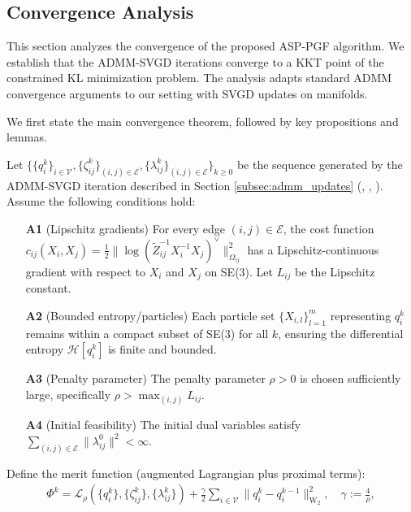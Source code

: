 \subsection{Convergence Analysis}
\label{sec:convergence}

This section analyzes the convergence of the proposed ASP-PGF algorithm. We establish that the ADMM-SVGD iterations converge to a KKT point of the constrained KL minimization problem. The analysis adapts standard ADMM convergence arguments to our setting with SVGD updates on manifolds.

We first state the main convergence theorem, followed by key propositions and lemmas.

\begin{theorem}
\label{thm:convergence}
Let $\{ \{q_i^k\}_{i \in {\mathcal{V}}}, \{\zeta_{ij}^k\}_{(i,j) \in {\mathcal{E}}}, \{\lambda_{ij}^k\}_{(i,j) \in {\mathcal{E}}} \}_{k \ge 0}$ be the sequence generated by the ADMM-SVGD iteration described in Section \ref{subsec:admm_updates} (, , ). Assume the following conditions hold:
\begin{itemize}
    \item[\textbf{A1}] (Lipschitz gradients) For every edge $(i,j) \in {\mathcal{E}}$, the cost function $c_{ij}(X_i, X_j) = \frac{1}{2} \| \log({\tilde{Z}}_{ij}^{-1} X_i^{-1} X_j)^{\vee} \|^2_{\Omega_{ij}}$ has a Lipschitz-continuous gradient with respect to $X_i$ and $X_j$ on SE(3). Let $L_{ij}$ be the Lipschitz constant.
    \item[\textbf{A2}] (Bounded entropy/particles) Each particle set $\{X_{i,l}\}_{l=1}^m$ representing $q_i^k$ remains within a compact subset of SE(3) for all $k$, ensuring the differential entropy ${\mathcal{H}}[q_i^k]$ is finite and bounded.
    \item[\textbf{A3}] (Penalty parameter) The penalty parameter $\rho > 0$ is chosen sufficiently large, specifically $\rho > \max_{(i,j)} L_{ij}$.
    \item[\textbf{A4}] (Initial feasibility) The initial dual variables satisfy $\sum_{(i,j) \in {\mathcal{E}}} \|\lambda_{ij}^0\|^2 < \infty$.
\end{itemize}
Define the merit function (augmented Lagrangian plus proximal terms):
\begin{equation}
\begin{aligned}
\Phi^k = {\mathcal{L}}_{\rho}(\{q_i^k\}, \{\zeta_{ij}^k\}, \{\lambda_{ij}^k\}) + \frac{\gamma}{2} \sum_{i \in {\mathcal{V}}} \|q_i^k - q_i^{k-1}\|^2_{\text{W}_2}, \quad \gamma := \frac{4}{\rho},

\end{aligned}
\end{equation}
\end{theorem}
